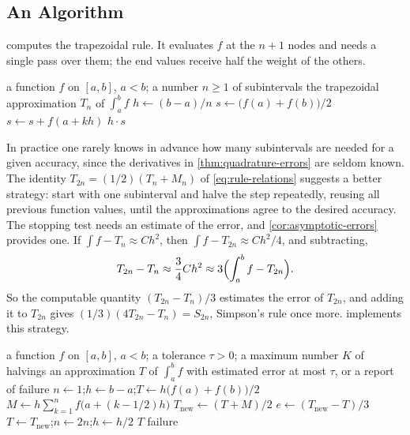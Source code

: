 \subsection{An Algorithm}

 computes the trapezoidal rule. It evaluates $f$ at the $n+1$ nodes and needs a single pass over them; the end values receive half the weight of the others.

\begin{algorithm}
\begin{algorithmic}[1]
\Require a function $f$ on $[a,b]$, $a<b$; a number $n\ge1$ of subintervals
\Ensure the trapezoidal approximation $T_n$ of $\int_a^bf$
\State $h\gets(b-a)/n$
\State $s\gets\bigl(f(a)+f(b)\bigr)/2$
  \State $s\gets s+f(a+kh)$
\EndFor
\State \Return $h\cdot s$
\end{algorithmic}
\caption{The composite trapezoidal rule with $n$ equal subintervals.}
\label{alg:trapezoid}
\end{algorithm}

In practice one rarely knows in advance how many subintervals are needed for a given accuracy, since the derivatives in \cref{thm:quadrature-errors} are seldom known. The identity $T_{2n}=(1/2)(T_n+M_n)$ of \eqref{eq:rule-relations} suggests a better strategy: start with one subinterval and halve the step repeatedly, reusing all previous function values, until the approximations agree to the desired accuracy. The stopping test needs an estimate of the error, and \cref{cor:asymptotic-errors} provides one. If $\int f-T_n\approx Ch^2$, then $\int f-T_{2n}\approx Ch^2/4$, and subtracting,
\[
T_{2n}-T_n\approx\frac34Ch^2\approx3\Bigl(\int_a^bf-T_{2n}\Bigr).
\]
So the computable quantity $(T_{2n}-T_n)/3$ estimates the error of $T_{2n}$, and adding it to $T_{2n}$ gives $(1/3)(4T_{2n}-T_n)=S_{2n}$, Simpson's rule once more.  implements this strategy.

\begin{algorithm}
\begin{algorithmic}[1]
\Require a function $f$ on $[a,b]$, $a<b$; a tolerance $\tau>0$; a maximum number $K$ of halvings
\Ensure an approximation $T$ of $\int_a^bf$ with estimated error at most $\tau$, or a report of failure
\State $n\gets1$;\quad $h\gets b-a$;\quad $T\gets h\bigl(f(a)+f(b)\bigr)/2$
  \State $M\gets h\sum_{k=1}^{n}f\bigl(a+(k-1/2)h\bigr)$ 
  \State $T_{\mathrm{new}}\gets(T+M)/2$ 
  \State $e\gets(T_{\mathrm{new}}-T)/3$ 
  \State $T\gets T_{\mathrm{new}}$;\quad $n\gets2n$;\quad $h\gets h/2$
   \Return $T$
  \EndIf
\EndFor
\State \Return failure 
\end{algorithmic}
\caption{The trapezoidal rule with repeated halving of the step. After $j$ passes it has evaluated $f$ at $2^j+1$ points, each once. Returning $T+e$ instead of $T$ gives Simpson's rule $S_n$.}
\label{alg:trapezoid-halving}
\end{algorithm}

